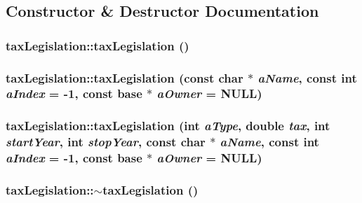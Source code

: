 \subsection{Constructor \& Destructor Documentation}
\hypertarget{classtax_legislation_a09b089449e25316b4b5df7984fc5a98e}{
\subsubsection[{taxLegislation}]{\setlength{\rightskip}{0pt plus 5cm}taxLegislation::taxLegislation ()}}
\label{classtax_legislation_a09b089449e25316b4b5df7984fc5a98e}
\hypertarget{classtax_legislation_a19c5e1bdde3d7eed93124fab88b4f8da}{
\subsubsection[{taxLegislation}]{\setlength{\rightskip}{0pt plus 5cm}taxLegislation::taxLegislation (const char $\ast$ {\em aName}, \/  const int {\em aIndex} = {\ttfamily -\/1}, \/  const {\bf base} $\ast$ {\em aOwner} = {\ttfamily NULL})}}
\label{classtax_legislation_a19c5e1bdde3d7eed93124fab88b4f8da}
\hypertarget{classtax_legislation_a6308fd276172e291d3510cc8435ab27e}{
\subsubsection[{taxLegislation}]{\setlength{\rightskip}{0pt plus 5cm}taxLegislation::taxLegislation (int {\em aType}, \/  double {\em tax}, \/  int {\em startYear}, \/  int {\em stopYear}, \/  const char $\ast$ {\em aName}, \/  const int {\em aIndex} = {\ttfamily -\/1}, \/  const {\bf base} $\ast$ {\em aOwner} = {\ttfamily NULL})}}
\label{classtax_legislation_a6308fd276172e291d3510cc8435ab27e}
\hypertarget{classtax_legislation_aea929ad962a5f32bb4d67fdbd72eddba}{
\subsubsection[{$\sim$taxLegislation}]{\setlength{\rightskip}{0pt plus 5cm}taxLegislation::$\sim$taxLegislation ()}}
\label{classtax_legislation_aea929ad962a5f32bb4d67fdbd72eddba}


